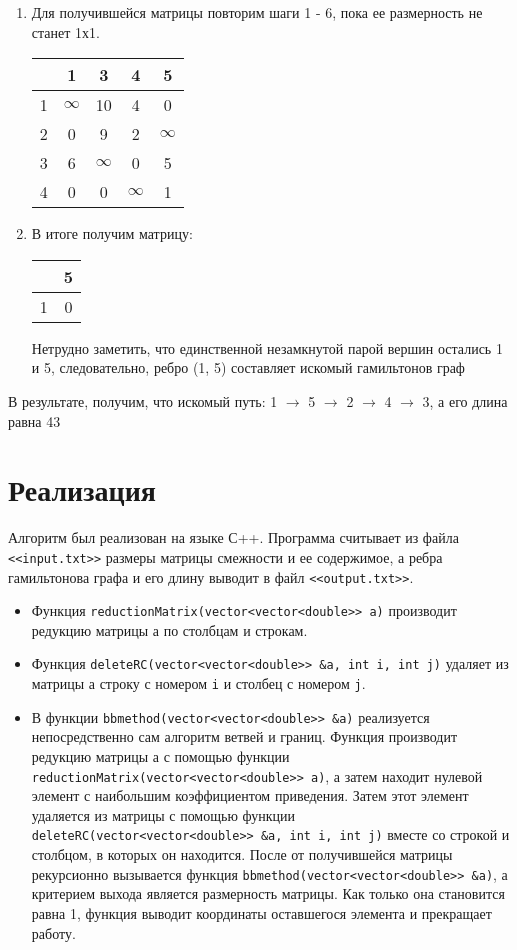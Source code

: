 \documentclass[a4paper, 12pt] {article}
\begin{document}
\begin{enumerate}
\item Для получившейся матрицы повторим шаги 1 - 6, пока ее размерность не станет 1х1.

\begin{tabular}{|c|c|c|c|c|}
\hline
& 1 & 3 & 4 & 5 \\
\hline
 1 & $\infty$ & 10 & 4 & 0 \\
\hline
2 & 0 & 9 & 2 & $\infty$ \\
\hline
3 & 6 & $\infty$ & 0 & 5 \\
\hline
4 & 0 & 0 & $\infty$ & 1 \\
\hline
\end{tabular}

\item В итоге получим матрицу:

\begin{tabular}{|c|c|}
\hline
& 5 \\
\hline
 1 & 0 \\
\hline
\end{tabular}

Нетрудно заметить, что единственной незамкнутой парой вершин остались 1 и 5, следовательно, ребро (1, 5) составляет искомый гамильтонов граф
\end{enumerate}
В результате, получим, что искомый путь: 1 $\rightarrow$ 5 $\rightarrow$ 2 $\rightarrow$ 4 $\rightarrow$ 3, а его длина равна 43

\newpage

\section{Реализация}
Алгоритм был реализован на языке С++. Программа считывает из файла \texttt{<<input.txt>>} размеры матрицы смежности и ее содержимое, а ребра гамильтонова графа и его длину выводит в файл \texttt{<<output.txt>>}. \\
\begin{itemize}
\item Функция \texttt{reductionMatrix(vector<vector<double>> a)} производит редукцию матрицы а по столбцам и строкам.
\item Функция \texttt{deleteRC(vector<vector<double>> \&a, int i, int j)} удаляет из матрицы а строку с номером \texttt{i} и столбец с номером \texttt{j}. 
\item В функции \texttt{bbmethod(vector<vector<double>> \&a)} реализуется непосредственно сам алгоритм ветвей и границ. Функция производит редукцию матрицы а с помощью функции \texttt{reductionMatrix(vector<vector<double>> a)}, а затем находит нулевой элемент с наибольшим коэффициентом приведения. Затем этот элемент удаляется из матрицы с помощью функции \texttt{deleteRC(vector<vector<double>> \&a, int i, int j)} вместе со строкой и столбцом, в которых он находится. После от получившейся матрицы рекурсионно вызывается функция \texttt{bbmethod(vector<vector<double>> \&a)}, а критерием выхода является размерность матрицы. Как только она становится равна 1, функция выводит координаты оставшегося элемента и прекращает работу.
\end{itemize}
\end{document}
